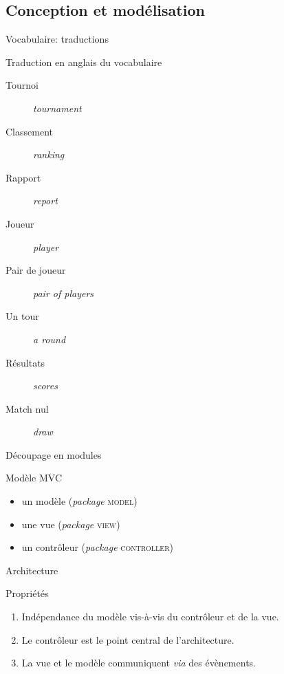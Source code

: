 \subsection{Conception et modélisation}

\begin{frame}{Vocabulaire: traductions}
  \begin{block}{Traduction en anglais du vocabulaire}
    \begin{description}
    \item[Tournoi] \textit{tournament}
    \item[Classement] \textit{ranking}
    \item[Rapport] \textit{report}
    \item[Joueur] \textit{player}
    \item[Pair de joueur] \textit{pair of players}
    \item[Un tour] \textit{a round}
    \item[Résultats] \textit{scores}
    \item[Match nul] \textit{draw}
    \end{description}
  \end{block}
\end{frame}

\begin{frame}{Découpage en modules}
  \begin{block}{Modèle MVC}
    \begin{itemize}
    \item un modèle (\textit{package} \textsc{model})
    \item une vue (\textit{package} \textsc{view})
    \item un contrôleur (\textit{package} \textsc{controller})
    \end{itemize}
  \end{block}
\end{frame}

\begin{frame}{Architecture}
  \begin{block}{Propriétés}
    \begin{enumerate}
    \item Indépendance du modèle vis-à-vis du contrôleur et de la vue.
    \item Le contrôleur est le point central de l'architecture.
    \item La vue et le modèle communiquent \textit{via} des
      évènements.
    \end{enumerate}
  \end{block}  
\end{frame}


